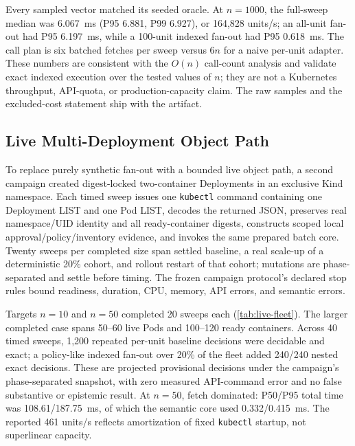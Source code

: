 Every sampled vector matched its seeded oracle. At $n=1000$, the full-sweep
median was 6.067~ms (P95 6.881, P99 6.927), or 164,828 units/s; an all-unit
fan-out had P95 6.197~ms, while a 100-unit indexed fan-out had P95 0.618~ms.
The call plan is six batched fetches per sweep versus $6n$ for a naive
per-unit adapter. These numbers are consistent with the $O(n)$ call-count
analysis and validate exact indexed execution over the tested values of $n$;
they are not a Kubernetes throughput, API-quota,
or production-capacity claim. The raw samples and the excluded-cost statement
ship with the artifact.

\subsection{Live Multi-Deployment Object Path}
To replace purely synthetic fan-out with a bounded live object path, a second
campaign created digest-locked two-container Deployments in an exclusive Kind
namespace. Each timed sweep issues one \texttt{kubectl} command containing one
Deployment LIST and one Pod LIST, decodes the returned JSON, preserves real
namespace/UID identity and all ready-container digests, constructs scoped
local approval/policy/inventory evidence, and invokes the same prepared batch
core. Twenty sweeps per completed size span settled baseline, a real scale-up
of a deterministic 20\% cohort, and rollout restart of that cohort; mutations
are phase-separated and settle before timing. The frozen campaign protocol's
declared stop rules bound
readiness, duration, CPU, memory, API errors, and semantic errors.

\begin{table}[t]
\centering
\caption{Live Kind Multi-Deployment Adapter Campaign. Times Are Milliseconds;
Pods and Containers Show the Settled Range Across Baseline and Churn Phases.
Fetch Includes \texttt{kubectl} Process Startup and Two Modeled LIST Operations.}
\label{tab:live-fleet}
\scriptsize
\resizebox{\textwidth}{!}{}
\end{table}

Targets $n=10$ and $n=50$ completed 20 sweeps each
(\cref{tab:live-fleet}). The larger completed case spans 50--60 live Pods and
100--120 ready containers. Across 40 timed sweeps, 1,200 repeated per-unit
baseline decisions were decidable and exact; a policy-like indexed fan-out
over 20\% of the fleet added 240/240 nested exact decisions. These are
projected provisional decisions under the campaign's phase-separated snapshot,
with zero
measured API-command error and no false substantive or epistemic result. At
$n=50$, fetch dominated: P50/P95 total time was
108.61/187.75~ms, of which the semantic core used 0.332/0.415~ms. The reported
461 units/s reflects amortization of fixed \texttt{kubectl} startup, not
superlinear capacity.

